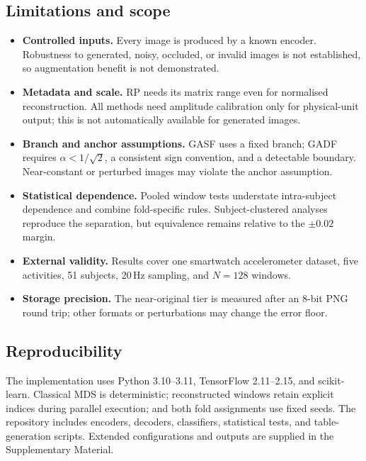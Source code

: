 \documentclass[10pt,a4paper,parskip=half-]{scrartcl}
\begin{document}
\subsection{Limitations and scope}
\label{sec:disc_scope}
\label{sec:threats}

\begin{itemize}
\item \textbf{Controlled inputs.} Every image is produced by a known encoder. Robustness to generated, noisy, occluded, or invalid images is not established, so augmentation benefit is not demonstrated.
\item \textbf{Metadata and scale.} RP needs its matrix range even for normalised reconstruction. All methods need amplitude calibration only for physical-unit output; this is not automatically available for generated images.
\item \textbf{Branch and anchor assumptions.} GASF uses a fixed branch; GADF requires \(\alpha<1/\sqrt2\), a consistent sign convention, and a detectable boundary. Near-constant or perturbed images may violate the anchor assumption.
\item \textbf{Statistical dependence.} Pooled window tests understate intra-subject dependence and combine fold-specific rules. Subject-clustered analyses reproduce the separation, but equivalence remains relative to the \(\pm0.02\) margin.
\item \textbf{External validity.} Results cover one smartwatch accelerometer dataset, five activities, 51 subjects, 20\,Hz sampling, and \(N=128\) windows.
\item \textbf{Storage precision.} The near-original tier is measured after an 8-bit PNG round trip; other formats or perturbations may change the error floor.
\end{itemize}

\subsection{Reproducibility}
\label{sec:reproducibility}

The implementation uses Python 3.10--3.11, TensorFlow 2.11--2.15, and scikit-learn. Classical MDS is deterministic; reconstructed windows retain explicit indices during parallel execution; and both fold assignments use fixed seeds. The repository includes encoders, decoders, classifiers, statistical tests, and table-generation scripts. Extended configurations and outputs are supplied in the Supplementary Material.
\end{document}
